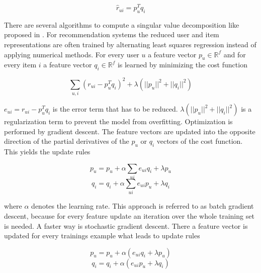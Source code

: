 \documentclass[10pt]{reportMaster}
\begin{document}
\begin{equation}
	\hat{r}_{ui} = p_u^T q_i
\end{equation}


There are several algorithms to compute a singular value decomposition like proposed in \cite{svdGolubSolution}.
For recommendation systems the reduced user and item representations are often trained by alternating least squares regression instead of applying numerical methods. %
For every user $u$ a feature vector $p_u \in \mathds{R}^f$ and for every item $i$ a feature vector $q_i \in \mathds{R}^f$ is learned by minimizing the cost function 

\begin{equation}
	\sum_{u, i}{(r_{ui} - p_u^T q_i)^2 + \lambda (||p_u||^2 + ||q_i||^2)}
\end{equation}

$e_{ui} = r_{ui} - p_u^T q_i$ is the error term that has to be reduced.
$\lambda (||p_u||^2 + ||q_i||^2)$ is a regularization term to prevent the model from overfitting.
Optimization is performed by gradient descent.
The feature vectors are updated into the opposite direction of the partial derivatives of the $p_u$ or $q_i$ vectors of the cost function.
This yields the update rules

\begin{equation}
	p_u = p_u + \alpha \sum_{ui}{e_{ui} q_i + \lambda p_u}
\end{equation}
\begin{equation}
	q_i = q_i + \alpha \sum_{ui}{e_{ui} p_u + \lambda q_i}
\end{equation}

where $\alpha$ denotes the learning rate.
This approach is referred to as batch gradient descent, because for every feature update an iteration over the whole training set is needed.
A faster way is stochastic gradient descent. %
There a feature vector is updated for every trainings example what leads to update rules 

\begin{equation}
	p_u = p_u + \alpha (e_{ui} q_i + \lambda p_u)
\end{equation}
\begin{equation}
	q_i = q_i + \alpha (e_{ui} p_u + \lambda q_i)
\end{equation}
\end{document}
